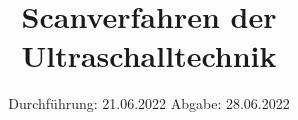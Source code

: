 

\subject{vUS2}
\title{Scanverfahren der Ultraschalltechnik}
\date{%
  Durchführung: 21.06.2022
  \hspace{3em}
  Abgabe: 28.06.2022
}



\maketitle
\thispagestyle{empty}
\tableofcontents
\newpage









